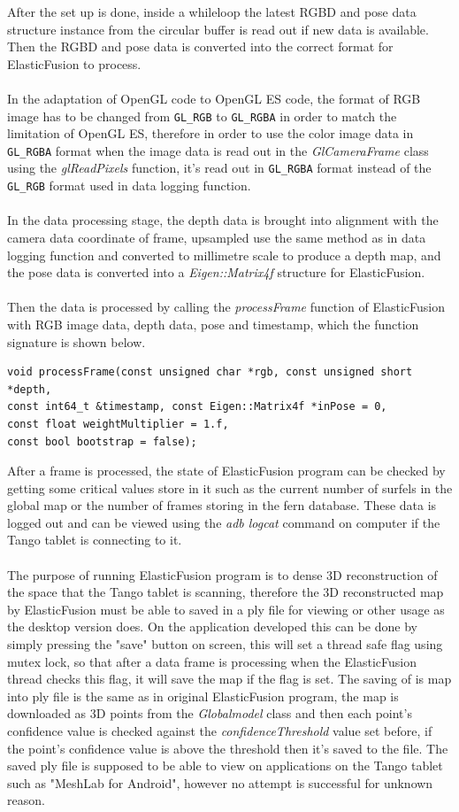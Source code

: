 \documentclass[12pt,twoside]{article}
\begin{document}
After the set up is done, inside a whileloop the latest RGBD and pose data structure instance from the circular buffer is read out if new data is available. Then the RGBD and pose data is converted into the correct format for ElasticFusion to process.\\
\\
In the adaptation of OpenGL code to OpenGL ES code, the format of RGB image has to be changed from \verb|GL_RGB| to \verb|GL_RGBA| in order to match the limitation of OpenGL ES, therefore in order to use the color image data in \verb|GL_RGBA| format when the image data is read out in the \textit{GlCameraFrame} class using the \textit{glReadPixels} function, it's read out in \verb|GL_RGBA| format instead of the \verb|GL_RGB| format used in data logging function.\\
\\
In the data processing stage, the depth data is brought into alignment with the camera data coordinate of frame,  upsampled use the same method as in data logging function and converted to millimetre scale to produce a depth map, and the pose data is converted into a \textit{Eigen::Matrix4f} structure for ElasticFusion.\\
\\
Then the data is processed by calling the \textit{processFrame} function of ElasticFusion with RGB image data, depth data, pose and timestamp, which the function signature is shown below.
\\
\begin{lstlisting}
void processFrame(const unsigned char *rgb, const unsigned short *depth,
const int64_t &timestamp, const Eigen::Matrix4f *inPose = 0,
const float weightMultiplier = 1.f,
const bool bootstrap = false);
\end{lstlisting}
After a frame is processed, the state of ElasticFusion program can be checked by getting some critical values store in it such as the current number of surfels in the global map or the number of frames storing in the fern database. These data is logged out and can be viewed using the \textit{adb logcat} command on computer if the Tango tablet is
connecting to it.\\
\\
The purpose of running ElasticFusion program is to dense 3D reconstruction of the space that the Tango tablet is scanning, therefore the 3D reconstructed map by ElasticFusion must be able to saved in a ply file for viewing or other usage as the desktop version does. On the application developed this can be done by simply pressing the "save" button on screen, this will set a thread safe flag using mutex lock, so that after a data frame is processing when the ElasticFusion thread checks this flag, it will save the map if the flag is set. The saving of is map into ply file is the same as in original ElasticFusion program, the map is downloaded as 3D points from the \textit{Globalmodel} class and then each point's confidence value is checked against the \textit{confidenceThreshold} value set before, if the point's confidence value is above the threshold then it's saved to the file. The saved ply file is supposed to be able to view on applications on the Tango tablet such as "MeshLab for Android", however no attempt is successful for unknown reason.\\
\end{document}
